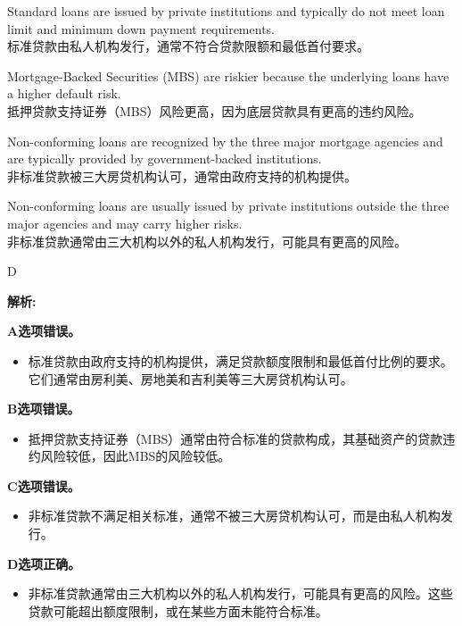 \documentclass{article}
\newenvironment{explanation}
{\textbf{解析:}\par}
{\par}
\begin{document}
\begin{choices}
    \item Standard loans are issued by private institutions and typically do not meet loan limit and minimum down payment requirements.\\
    标准贷款由私人机构发行，通常不符合贷款限额和最低首付要求。
    \item Mortgage-Backed Securities (MBS) are riskier because the underlying loans have a higher default risk.\\
    抵押贷款支持证券（MBS）风险更高，因为底层贷款具有更高的违约风险。
    \item Non-conforming loans are recognized by the three major mortgage agencies and are typically provided by government-backed institutions.\\
    非标准贷款被三大房贷机构认可，通常由政府支持的机构提供。
    \item Non-conforming loans are usually issued by private institutions outside the three major agencies and may carry higher risks.\\
    非标准贷款通常由三大机构以外的私人机构发行，可能具有更高的风险。
\end{choices}

\begin{correctanswer}
    D
\end{correctanswer}

\begin{explanation}

    \textbf{A选项错误。}
    \begin{itemize}
        \item 标准贷款由政府支持的机构提供，满足贷款额度限制和最低首付比例的要求。它们通常由房利美、房地美和吉利美等三大房贷机构认可。
    \end{itemize}
    
    \textbf{B选项错误。}
    \begin{itemize}
        \item 抵押贷款支持证券（MBS）通常由符合标准的贷款构成，其基础资产的贷款违约风险较低，因此MBS的风险较低。
    \end{itemize}
    
    \textbf{C选项错误。}
    \begin{itemize}
        \item 非标准贷款不满足相关标准，通常不被三大房贷机构认可，而是由私人机构发行。
    \end{itemize}
    
    \textbf{D选项正确。}
    \begin{itemize}
        \item 非标准贷款通常由三大机构以外的私人机构发行，可能具有更高的风险。这些贷款可能超出额度限制，或在某些方面未能符合标准。
    \end{itemize}

\end{explanation}
\end{document}
